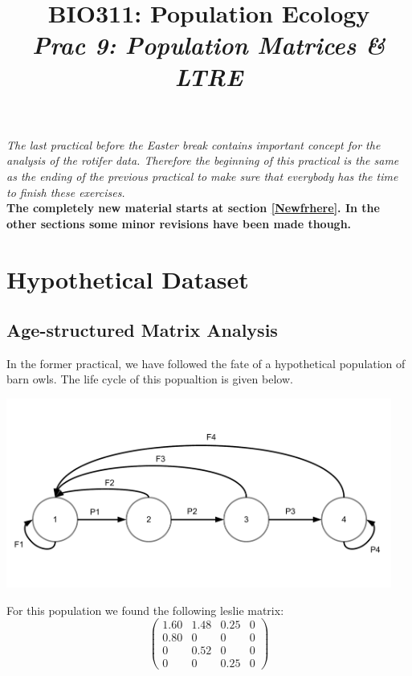 \documentclass{article}\usepackage[]{graphicx}\usepackage[]{color}
\title{BIO311: Population Ecology\\ \textit{Prac 9: Population Matrices \& LTRE}}
\begin{document}




\maketitle
\tableofcontents
\vspace{3cm}
\newpage
\begin{mdframed}
\textit{The last practical before the Easter break contains important concept for the analysis of the rotifer data. Therefore the beginning of this practical is the same as the ending of the previous practical to make sure that everybody has the time to finish these exercises.}\\[1.5ex]
\textbf{The completely new material starts at section \ref{Newfrhere}. In the other sections some minor revisions have been made though.}
\end{mdframed}
\section{Hypothetical Dataset}
\subsection{Age-structured Matrix Analysis}
In the former practical, we have followed the fate of a hypothetical population of barn owls. The life cycle of this popualtion is given below.
\begin{center}
\includegraphics[width=0.95\textwidth]{Barn_owl_life_cycle.pdf}
\end{center}
For this population we found the following leslie matrix:
\begin{equation}
\begin{pmatrix}
1.60&1.48&0.25&0\\
0.80&0&0&0\\
0&0.52&0&0\\
0&0&0.25&0
\end{pmatrix}
\end{equation}
\end{document}
